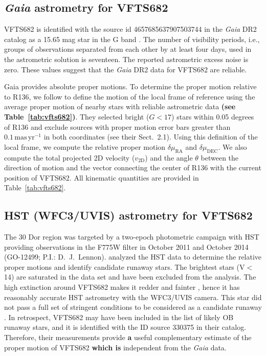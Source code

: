 \documentclass[a4paper,fleqn,usenatbib]{mnras}
\newcommand{\newtext}[1]{{\color{ForestGreen}\bf{#1}}}
\newcommand{\masyr}{\,\mathrm{mas}\,\mathrm{yr}^{-1}}
\DeclareRobustCommand{\Tabref}[1]{Table~\ref{#1}}
\begin{document}
\subsection{ \emph{Gaia} astrometry for VFTS682\label{data:gaia}}


VFTS682 is identified with the source id 4657685637907503744 in the
\emph{Gaia} DR2 catalog %
  as a 15.65 mag star in the G band
\citep{gaia:16,brown:18}.   The number of visibility periods,
i.e., groups of observations separated from each other by at
least four days, used in the astrometric solution is seventeen. The reported astrometric excess noise is zero.  These values
suggest that the \emph{Gaia} DR2  data for VFTS682 are
reliable.

Gaia provides absolute proper motions.  To determine the
proper motion relative to R136, we follow  \citet{lennon:18} to
define the motion of the local frame of reference using the average
proper motion of nearby stars with reliable astrometric data \newtext{(see \Tabref{tab:vfts682})}.  They
selected bright ($G<17$) stars within 0.05 degrees of R136 and exclude
sources with proper motion error bars greater than $0.1\masyr$ in both
coordinates (see their  Sect.~2.1).  Using this definition of the
local frame, we compute the relative proper motion
$\delta\mu_\mathrm{RA}$ and $\delta\mu_\mathrm{DEC}$.   We also compute the total projected 2D velocity
($v_\mathrm{2D}$) and the angle $\theta$ between the direction of motion and the vector
connecting the center of R136 with the current position of VFTS682.
All kinematic quantities are provided in
\Tabref{tab:vfts682}. 

\vspace*{-15pt}
\subsection{HST (WFC3/UVIS) astrometry for VFTS682}

The 30 Dor region was targeted by a two-epoch photometric campaign
with HST providing observations in the F775W filter in October 2011
and October 2014 (GO-12499; P.I.: D.~J.~Lennon). 
\citet{platais:15, platais:18} analyzed the HST data to determine the
relative proper motions and identify candidate runaway stars. The
brightest stars (V$<$14) are saturated in the data set and have been
excluded from the analysis. The high extinction around VFTS682
makes it redder and fainter \citep[$V=16.08$,
$B-V=0.58$,][]{evans:11}, hence it has reasonably accurate HST astrometry
with the WFC3/UVIS camera. This star did not pass a full set of stringent
conditions to be considered as a candidate runaway \citep[][]{platais:18}.
In retrospect, VFTS682 may have been included in the list of likely
OB runaway stars, and it is identified
with the ID source 330375 in their catalog. 
Therefore, their measurements provide \newtext{a} useful
complementary estimate of the proper motion of VFTS682 \newtext{which is} independent from the \emph{Gaia} data. 
 
\end{document}
